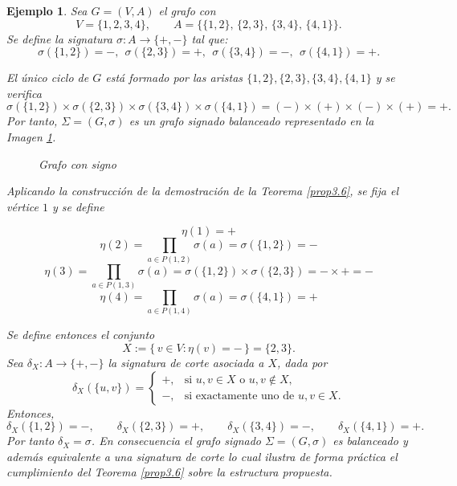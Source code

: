 \documentclass[11pt,a4paper,spanish]{report}
\theoremstyle{plain}
\newtheorem{ejemplo}{Ejemplo}[chapter]
\begin{document}
\begin{ejemplo}
Sea $G=(V,A)$ el grafo con 
\[
V=\{1,2,3,4\}, \qquad 
A=\{\{1,2\},\,\{2,3\},\,\{3,4\},\,\{4,1\}\}.
\]
Se define la signatura $\sigma:A\longrightarrow\{+,-\}$ tal que:
\[
\sigma(\{1,2\})=-,\ \ \sigma(\{2,3\})=+,\ \ \sigma(\{3,4\})=-,\ \ \sigma(\{4,1\})=+.
\]

El único ciclo de $G$ está formado por las aristas 
$\{1,2\},\{2,3\},\{3,4\},\{4,1\}$ y se verifica
\[
\sigma(\{1,2\})\times\sigma(\{2,3\})\times\sigma(\{3,4\})\times\sigma(\{4,1\})
=(-)\times(+)\times(-)\times(+)=+.
\]
Por tanto, $\Sigma=(G,\sigma)$ es un grafo signado balanceado representado en la Imagen \ref{3.6}.


\begin{figure}[H]
\begin{center}
\end{center}
     \caption{{Grafo con signo}}
     \label{3.6}
\end{figure}
Aplicando la construcción de la demostración de la Teorema \ref{prop3.6},
se fija el vértice $1$ y se define

    


\[
\eta(1)=+
\]
\[\eta(2)=\prod_{a\in P(1,2)}\sigma(a)=\sigma(\{1,2\})=-\]
\[
\eta(3)=\prod_{a\in P(1,3)}\sigma(a)=\sigma(\{1,2\})\times\sigma(\{2,3\})=-\times +=-
\]
\[\eta(4)=\prod_{a\in P(1,4)}\sigma(a)=\sigma(\{4,1\})=+\]

Se define entonces el conjunto
\[
X:=\{\,v\in V:\eta(v)=-\,\}=\{2,3\}.
\]
Sea $\delta_X:A\to\{+,-\}$ la signatura de corte asociada a $X$, dada por
\[
\delta_X(\{u,v\})=
\begin{cases}
+,& \text{si }u,v\in X\text{ o }u,v\notin X,\\
-,& \text{si exactamente uno de }u,v\in X.
\end{cases}
\]
Entonces,
\[
\delta_X(\{1,2\})=-,\qquad 
\delta_X(\{2,3\})=+,\qquad 
\delta_X(\{3,4\})=-,\qquad 
\delta_X(\{4,1\})=+.
\]
Por tanto $\delta_X=\sigma$. En consecuencia el grafo signado $\Sigma=(G,\sigma)$ es balanceado y además equivalente a una signatura de corte lo cual ilustra de forma práctica el cumplimiento del Teorema \ref{prop3.6} sobre la estructura propuesta.

\end{ejemplo}
\end{document}
